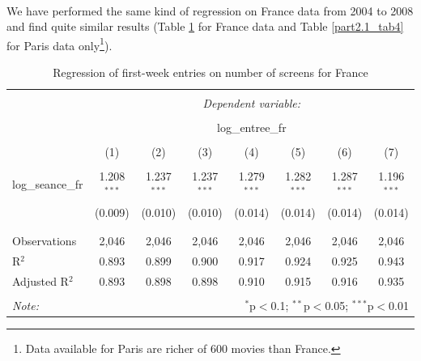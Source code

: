 \paragraph*{}
We have performed the same kind of regression on France data from 2004 to 2008 and find quite similar results (Table \ref{part2.1_tab3} for France data and Table \ref{part2.1_tab4} for Paris data only\footnote{Data available for Paris are richer of 600 movies than France.}).
\begin{table}[!htbp] \centering 
	\caption{Regression of first-week entries on number of screens for France} 
	\label{part2.1_tab3} 
	\begin{tabular}{@{\extracolsep{5pt}}lccccccc} 
		\\[-1.8ex]\hline 
		\hline \\[-1.8ex] 
		& \multicolumn{7}{c}{\textit{Dependent variable:}} \\ 
		\cline{2-8} 
		\\[-1.8ex] & \multicolumn{7}{c}{log\_entree\_fr} \\ 
		\\[-1.8ex] & (1) & (2) & (3) & (4) & (5) & (6) & (7)\\ 
		\hline \\[-1.8ex] 
		log\_seance\_fr & 1.208$^{***}$ & 1.237$^{***}$ & 1.237$^{***}$ & 1.279$^{***}$ & 1.282$^{***}$ & 1.287$^{***}$ & 1.196$^{***}$ \\ 
		& (0.009) & (0.010) & (0.010) & (0.014) & (0.014) & (0.014) & (0.014) \\ 
		& & & & & & & \\ 
		\hline \\[-1.8ex] 
		Observations & 2,046 & 2,046 & 2,046 & 2,046 & 2,046 & 2,046 & 2,046 \\ 
		R$^{2}$ & 0.893 & 0.899 & 0.900 & 0.917 & 0.924 & 0.925 & 0.943 \\ 
		Adjusted R$^{2}$ & 0.893 & 0.898 & 0.898 & 0.910 & 0.915 & 0.916 & 0.935 \\ 
		\hline 
		\hline \\[-1.8ex] 
		\textit{Note:}  & \multicolumn{7}{r}{$^{*}$p$<$0.1; $^{**}$p$<$0.05; $^{***}$p$<$0.01} \\ 
	\end{tabular} 
\end{table} 

